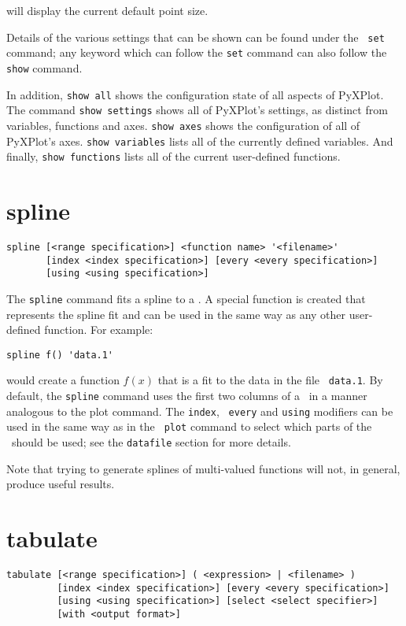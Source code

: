 \noindent will display the current default point size.

Details of the various settings that can be shown can be found under the {\tt
set} command; any keyword which can follow the {\tt set} command can also follow
the {\tt show} command.

In addition, {\tt show all} shows the configuration state of all aspects of
PyXPlot. The command {\tt show settings} shows all of PyXPlot's settings, as
distinct from variables, functions and axes. {\tt show axes} shows the
configuration of all of PyXPlot's axes. {\tt show variables} lists all of the
currently defined variables. And finally, {\tt show functions} lists all of the
current user-defined functions.


\section{spline}

\begin{verbatim}
spline [<range specification>] <function name> '<filename>' 
       [index <index specification>] [every <every specification>]
       [using <using specification>]
\end{verbatim}

The {\tt spline} command fits a spline to a \datafile. A special function is
created that represents the spline fit and can be used in the same way as any
other user-defined function. For example:

\begin{verbatim}
spline f() 'data.1'
\end{verbatim}

\noindent would create a function $f(x)$ that is a fit to the data in the file {\tt
data.1}. By default, the {\tt spline} command uses the first two columns of a
\datafile\ in a manner analogous to the plot command. The {\tt index}, {\tt
every} and {\tt using} modifiers can be used in the same way as in the {\tt
plot} command to select which parts of the \datafile\ should be used; see the
{\tt datafile} section for more details.

Note that trying to generate splines of multi-valued functions will not, in
general, produce useful results.

\section{tabulate}

\begin{verbatim}
tabulate [<range specification>] ( <expression> | <filename> )
         [index <index specification>] [every <every specification>]
         [using <using specification>] [select <select specifier>]
         [with <output format>]
\end{verbatim}


